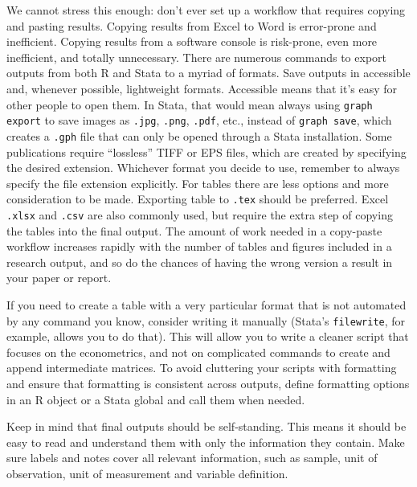 We cannot stress this enough:
don't ever set up a workflow that requires copying and pasting results.
Copying results from Excel to Word is error-prone and inefficient.
Copying results from a software console is risk-prone,
even more inefficient, and totally unnecessary.
There are numerous commands to export outputs from both R and Stata to a myriad of formats.
Save outputs in accessible and, whenever possible, lightweight formats.
Accessible means that it's easy for other people to open them.
In Stata, that would mean always using \texttt{graph export} to save images as
\texttt{.jpg}, \texttt{.png}, \texttt{.pdf}, etc.,
instead of \texttt{graph save},
which creates a \texttt{.gph} file that can only be opened through a Stata installation.
Some publications require ``lossless'' TIFF or EPS files, which are created by specifying the desired extension.
Whichever format you decide to use, remember to always specify the file extension explicitly.
For tables there are less options and more consideration to be made.
Exporting table to \texttt{.tex} should be preferred.
Excel \texttt{.xlsx} and \texttt{.csv} are also commonly used,
but require the extra step of copying the tables into the final output.
The amount of work needed in a copy-paste workflow increases rapidly with the number of tables and figures included in a research output,
and so do the chances of having the wrong version a result in your paper or report.

If you need to create a table with a very particular format
that is not automated by any command you know, consider writing it manually
(Stata's \texttt{filewrite}, for example, allows you to do that).
This will allow you to write a cleaner script that focuses on the econometrics,
and not on complicated commands to create and append intermediate matrices.
To avoid cluttering your scripts with formatting and ensure that formatting is consistent across outputs,
define formatting options in an R object or a Stata global and call them when needed.

Keep in mind that final outputs should be self-standing.
This means it should be easy to read and understand them with only the information they contain.
Make sure labels and notes cover all relevant information, such as sample,
unit of observation, unit of measurement and variable definition.

